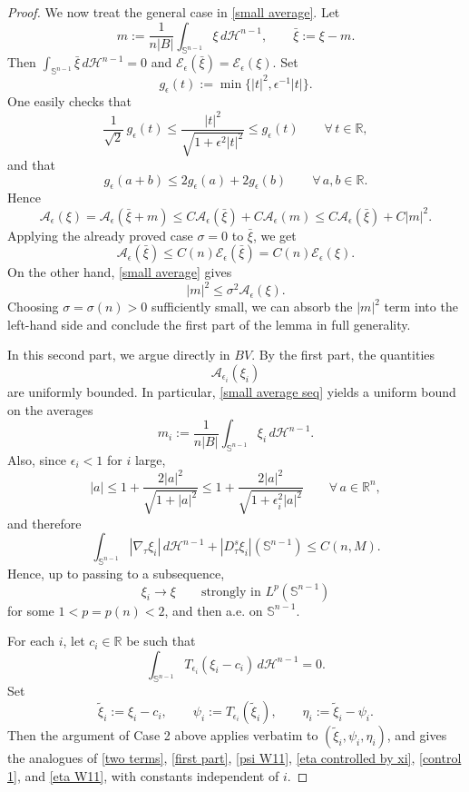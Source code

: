 \documentclass[10pt,a4paper]{amsart}
\def\sz{\sigma}
\begin{document}
\begin{proof}
\medskip
We now treat the general case in \eqref{small average}. Let
$$
m:=\frac{1}{n|B|}\int_{\mathbb S^{n-1}}\xi\,d\mathscr H^{n-1},
\qquad
\bar\xi:=\xi-m.
$$
Then $\int_{\mathbb S^{n-1}}\bar\xi\,d\mathscr H^{n-1}=0$ and $\mathcal E_\epsilon(\bar\xi)=\mathcal E_\epsilon(\xi)$.
Set
$$
g_\epsilon(t):=\min\{|t|^2,\epsilon^{-1}|t|\}.
$$
One easily checks that
$$
\frac1{\sqrt2}\,g_\epsilon(t)\le \frac{|t|^2}{\sqrt{1+\epsilon^2|t|^2}}\le g_\epsilon(t)
\qquad\forall\, t\in\mathbb R,
$$
and that
$$
g_\epsilon(a+b)\le 2g_\epsilon(a)+2g_\epsilon(b)\qquad\forall\, a,b\in\mathbb R.
$$
Hence
$$
\mathcal A_\epsilon(\xi)=\mathcal A_\epsilon(\bar\xi+m)\le C \mathcal A_\epsilon(\bar\xi)+C \mathcal A_\epsilon(m)\le C \mathcal A_\epsilon(\bar\xi)+C |m|^2.
$$
Applying the already proved case $\sz=0$ to $\bar\xi$, we get
$$
\mathcal A_\epsilon(\bar\xi)\le C(n)\mathcal E_\epsilon(\bar\xi)=C(n)\mathcal E_\epsilon(\xi).
$$
On the other hand, \eqref{small average} gives
$$
|m|^2\le \sz^2 \mathcal A_\epsilon(\xi).
$$
Choosing $\sz=\sz(n)>0$ sufficiently small, we can absorb the $|m|^2$ term into the left-hand side and conclude the first part of the lemma in full generality.


\medskip

 In this second part, we argue directly in $BV$.
By the first part, the quantities
$$
\mathcal  A_{\epsilon_i}(\xi_i)
$$
are uniformly bounded. In particular, \eqref{small average seq} yields a uniform bound on the averages
$$
m_i:=\frac{1}{n|B|}\int_{\mathbb S^{n-1}}\xi_i\,d\mathscr H^{n-1}.
$$
Also, since $\epsilon_i<1$ for $i$ large,
$$
|a|\le 1+\frac{2|a|^2}{\sqrt{1+|a|^2}}
\le 1+\frac{2|a|^2}{\sqrt{1+\epsilon_i^2|a|^2}}
\qquad\forall\, a\in\mathbb R^n,
$$
and therefore
$$
\int_{\mathbb S^{n-1}} |\nabla_\tau \xi_i|\,d\mathscr H^{n-1}
+|D^s_\tau \xi_i|(\mathbb S^{n-1})
\le C(n,M).
$$
Hence, up to passing to a subsequence,
$$
\xi_i\to \xi \qquad\text{strongly in }L^p(\mathbb S^{n-1})
$$
for some $1<p=p(n)<2$, and then a.e. on $\mathbb S^{n-1}$.

For each $i$, let $c_i\in\mathbb R$ be such that
$$
\int_{\mathbb S^{n-1}} T_{\epsilon_i}(\xi_i-c_i)\,d\mathscr H^{n-1}=0.
$$
Set
$$
\tilde\xi_i:=\xi_i-c_i,\qquad
\psi_i:=T_{\epsilon_i}(\tilde\xi_i),\qquad
\eta_i:=\tilde\xi_i-\psi_i.
$$
Then the argument of Case 2 above applies verbatim to $(\tilde\xi_i,\psi_i,\eta_i)$, and gives the analogues of \eqref{two terms}, \eqref{first part}, \eqref{psi W11}, \eqref{eta controlled by xi}, \eqref{control 1}, and \eqref{eta W11}, with constants independent of $i$.


\end{proof}
\end{document}
